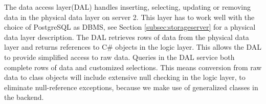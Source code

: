 The data access layer(DAL) handles inserting, selecting, updating or removing data in the physical data layer on server 2. This layer has to work well with the choice of PostgreSQL as DBMS, see Section \ref{subsec:storageserver} for a physical data layer description. The DAL retrieves rows of data from the physical data layer and returns references to C\# objects in the logic layer. This allows the DAL to provide simplified access to raw data. Queries in the DAL service both complete rows of data and customized selections. This means conversion from raw data to class objects will include extensive null checking in the logic layer, to eliminate null-reference exceptions, because we make use of generalized classes in the backend. 